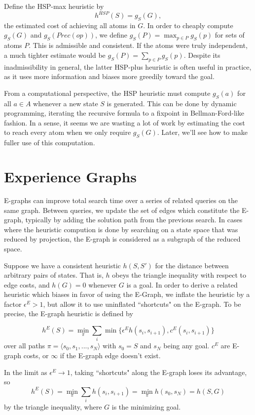 \documentclass[letterpaper]{article}
\begin{document}
Define the HSP-max heuristic by \[h^{HSP}(S) = g_S(G),\] the estimated cost of achieving all atoms in $G$. In order to cheaply compute $g_S(G)$ and $g_S(Prec(op))$, we define $g_S(P) = \max_{p\in P} g_S(p)$ for sets of atoms $P$. This is admissible and consistent. If the atoms were truly independent, a much tighter estimate would be $g_S(P) = \sum_{p\in P} g_S(p)$. Despite its inadmissibility in general, the latter HSP-plus heuristic is often useful in practice, as it uses more information and biases more greedily toward the goal.

From a computational perspective, the HSP heuristic must compute $g_S(a)$ for all $a\in A$ whenever a new state $S$ is generated. This can be done by dynamic programming, iterating the recursive formula to a fixpoint in Bellman-Ford-like fashion. In a sense, it seems we are wasting a lot of work by estimating the cost to reach every atom when we only require $g_S(G)$. Later, we'll see how to make fuller use of this computation.

\section{Experience Graphs}

E-graphs can improve total search time over a series of related queries on the same graph.
Between queries, we update the set of edges which constitute the E-graph, typically by adding the solution path from the previous search.
In cases where the heuristic compution is done by searching on a state space that was reduced by projection, the E-graph is considered as a subgraph of the reduced space.

Suppose we have a consistent heuristic $h(S,S')$ for the distance between arbitrary pairs of states. That is, $h$ obeys the triangle inequality with respect to edge costs, and $h(G) = 0$ whenever $G$ is a goal. In order to derive a related heuristic which biases in favor of using the E-Graph, we inflate the heuristic by a factor $\epsilon^E > 1$, but allow it to use uninflated ``shortcuts" on the E-graph. To be precise, the E-graph heuristic is defined by

\[h^E(S) = \min_\pi \sum_i \min \{\epsilon^E h(s_i,s_{i+1}),c^E(s_i,s_{i+1})\}\]
over all paths $\pi = \langle s_0,s_1,...,s_N \rangle$ with $s_0 = S$ and $s_N$ being any goal. $c^E$ are E-graph costs, or $\infty$ if the E-graph edge doesn't exist.

In the limit as $\epsilon^E \rightarrow 1$, taking ``shortcuts" along the E-graph loses its advantage, so \[h^E(S) = \min_\pi \sum_i h(s_i,s_{i+1}) = \min_\pi h(s_0,s_N) = h(S,G)\]
by the triangle inequality, where $G$ is the minimizing goal.
\end{document}
